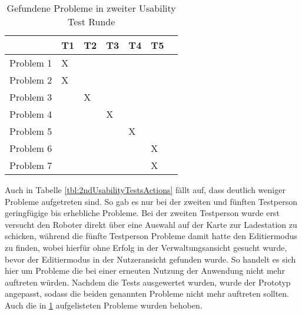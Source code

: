 \begin{table}[H]
    \caption{Gefundene Probleme in zweiter Usability Test Runde}\label{tbl:2ndUsabilityTestsProblems}
    \begin{tabular}{l||l|l|l|l|l|l}
                    & T1    & T2    & T3    & T4    & T5    \\ \hline
        Problem 1   & X     &       &       &       &       \\
        Problem 2   & X     &       &       &       &       \\
        Problem 3   &       & X     &       &       &       \\
        Problem 4   &       &       & X     &       &       \\
        Problem 5   &       &       &       & X     &       \\
        Problem 6   &       &       &       &       & X     \\
        Problem 7   &       &       &       &       & X     \\
    \end{tabular}    
\end{table}

Auch in Tabelle \ref{tbl:2ndUsabilityTestsActions} fällt auf, dass deutlich weniger Probleme aufgetreten sind. So gab es nur bei der zweiten und fünften Testperson geringfügige bis erhebliche Probleme. Bei der zweiten Testperson wurde erst versucht den Roboter direkt über eine Auswahl auf der Karte zur Ladestation zu schicken, während die fünfte Testperson Probleme damit hatte den Editiermodus zu finden, wobei hierfür ohne Erfolg in der Verwaltungsansicht gesucht wurde, bevor der Editiermodus in der Nutzeransicht gefunden wurde. So handelt es sich hier um Probleme die bei einer erneuten Nutzung der Anwendung nicht mehr auftreten würden. Nachdem die Tests ausgewertet wurden, wurde der Prototyp angepasst, sodass die beiden genannten Probleme nicht mehr auftreten sollten. Auch die in \ref{tbl:2ndUsabilityTestsProblems} aufgelisteten Probleme wurden behoben.

